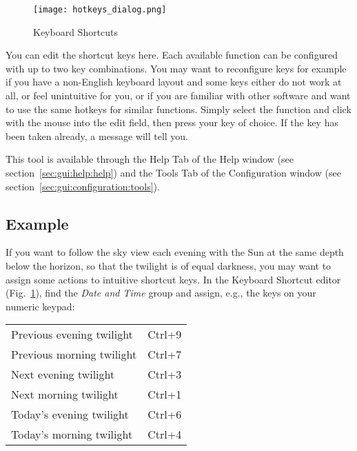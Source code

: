 \begin{figure}[htbp]
\centering\texttt{[image: hotkeys\_dialog.png]}
\caption{Keyboard Shortcuts}
\label{fig:gui:hotkeys}
\end{figure}

You can edit the shortcut keys here. Each available function can be
configured with up to two key combinations. You may want to
reconfigure keys for example if you have a non-English keyboard layout
and some keys either do not work at all, or feel unintuitive for you,
or if you are familiar with other software and want to use the same
hotkeys for similar functions. Simply select the function and click
with the mouse into the edit field, then press your key of choice. If
the key has been taken already, a message will tell you.

This tool is available through the Help Tab of the Help window (see section~\ref{sec:gui:help:help}) and the
Tools Tab of the Configuration window (see section~\ref{sec:gui:configuration:tools}).

\subsection{Example}
\label{sec:gui:help:hotkeys:example}

If you want  to follow the sky view each evening
with the Sun at the same depth below the horizon, so that the twilight
is of equal darkness, you may want to assign some actions to intuitive
shortcut keys. In the Keyboard Shortcut editor
(Fig.~\ref{fig:gui:hotkeys}), find the \emph{Date and Time} group and
assign, e.g., the keys on your numeric keypad:

\begin{tabular}{ll}
  Previous evening twilight & Ctrl+9 \\
  Previous morning twilight & Ctrl+7 \\
  Next evening twilight     & Ctrl+3 \\
  Next morning twilight     & Ctrl+1 \\
  Today's evening twilight  & Ctrl+6 \\
  Today's morning twilight  & Ctrl+4 \\
\end{tabular}









